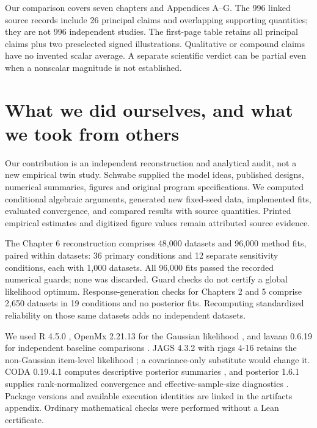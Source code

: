 \documentclass[11pt]{article}
\begin{document}
Our comparison covers seven chapters and Appendices A--G. The 996 linked source records include 26 principal claims and overlapping supporting quantities; they are not 996 independent studies. The first-page table retains all principal claims plus two preselected signed illustrations. Qualitative or compound claims have no invented scalar average. A separate scientific verdict can be partial even when a nonscalar magnitude is not established.

\section{What we did ourselves, and what we took from others}
Our contribution is an independent reconstruction and analytical audit, not a new empirical twin study. Schwabe supplied the model ideas, published designs, numerical summaries, figures and original program specifications. We computed conditional algebraic arguments, generated new fixed-seed data, implemented fits, evaluated convergence, and compared results with source quantities. Printed empirical estimates and digitized figure values remain attributed source evidence.

The Chapter 6 reconstruction comprises 48,000 datasets and 96,000 method fits, paired within datasets: 36 primary conditions and 12 separate sensitivity conditions, each with 1,000 datasets. All 96,000 fits passed the recorded numerical guards; none was discarded. Guard checks do not certify a global likelihood optimum. Response-generation checks for Chapters 2 and 5 comprise 2,650 datasets in 19 conditions and no posterior fits. Recomputing standardized reliability on those same datasets adds no independent datasets.

We used R 4.5.0 \citep{r2025}, OpenMx 2.21.13 for the Gaussian likelihood \citep{neale2016}, and lavaan 0.6.19 for independent baseline comparisons \citep{rosseel2012}. JAGS 4.3.2 with rjags 4-16 retains the non-Gaussian item-level likelihood \citep{rjags2024}; a covariance-only substitute would change it. CODA 0.19.4.1 computes descriptive posterior summaries \citep{coda2006}, and posterior 1.6.1 supplies rank-normalized convergence and effective-sample-size diagnostics \citep{vehtari2021}. Package versions and available execution identities are linked in the artifacts appendix. Ordinary mathematical checks were performed without a Lean certificate.
\end{document}
